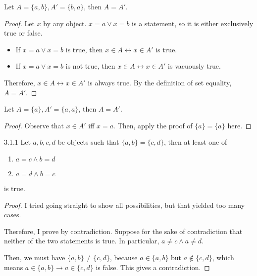 \begin{why}{30}
	Let $A = \{a,b\}, A' = \{b,a\}$, then $A = A'$.
\end{why}
\begin{proof}
	Let $x$ by any object. $x = a \vee x = b$ is a statement, so it is either exclusively true or false.
	
	\begin{itemize}
		\item If $x = a \vee x = b$ is true, then $x \in A \leftrightarrow x \in A'$ is true.
		\item If $x = a \vee x = b$ is not true, then $x \in A \leftrightarrow x \in A'$ is vacuously true.		
	\end{itemize}
	
	Therefore, $x \in A \leftrightarrow x \in A'$ is always true. By the definition of set equality, $A = A'$.
\end{proof}

\begin{why}{30}
	Let $A = \{a\}, A' = \{a,a\}$, then $A = A'$.
\end{why}
\begin{proof}
	Observe that $x \in A'$ iff $x = a$. Then, apply the proof of $\{a\} = \{a\}$ here.
\end{proof}

\begin{exercise}{3.1.1}
	Let $a,b,c,d$ be objects such that $\{a,b\} = \{c,d\}$, then at least one of
	\begin{enumerate}
		\item $a = c \wedge b = d$
		\item $a = d \wedge b = c$
	\end{enumerate}
	is true.
\end{exercise}
\begin{proof}
	I tried going straight to show all possibilities, but that yielded too many cases.
	
	Therefore, I prove by contradiction. Suppose for the sake of contradiction that neither of the two statements is true. In particular, $a \ne c \wedge a \ne d$.
	
	Then, we must have $\{a,b\} \ne \{c,d\}$, because $a \in \{a,b\}$ but $a \notin \{c, d\}$, which means $a \in \{a,b\} \to a \in \{c,d\}$ is false. This gives a contradiction.
\end{proof}

